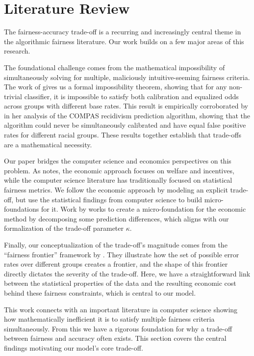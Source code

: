 \section{Literature Review}

The fairness-accuracy trade-off is a recurring and increasingly central theme in the algorithmic fairness literature. Our work builds on a few major areas of this research.

The foundational challenge comes from the mathematical impossibility of simultaneously solving for multiple, maliciously intuitive-seeming fairness criteria. The work of \citet{Kleinberg2017} gives us a formal impossibility theorem, showing that for any non-trivial classifier, it is impossible to satisfy both calibration and equalized odds across groups with different base rates. This result is empirically corroborated by \citet{Chouldechova2017} in her analysis of the COMPAS recidivism prediction algorithm, showing that the algorithm could never be simultaneously calibrated and have equal false positive rates for different racial groups. These results together establish that trade-offs are a mathematical necessity.

Our paper bridges the computer science and economics perspectives on this problem. As \citet{Gans2025} notes, the economic approach focuses on welfare and incentives, while the computer science literature has traditionally focused on statistical fairness metrics. We follow the economic approach by modeling an explicit trade-off, but use the statistical findings from computer science to build micro-foundations for it. Work by \citet{Rambachan2020} works to create a micro-foundation for the economic method by decomposing some prediction differences, which aligns with our formalization of the trade-off parameter $\kappa$.

Finally, our conceptualization of the trade-off's magnitude comes from the ``fairness frontier'' framework by \citet{Liang2025}. They illustrate how the set of possible error rates over different groups creates a frontier, and the shape of this frontier directly dictates the severity of the trade-off. Here, we have a straightforward link between the statistical properties of the data and the resulting economic cost behind these fairness constraints, which is central to our model.

This work connects with an important literature in computer science showing how mathematically inefficient it is to satisfy multiple fairness criteria simultaneously. From this we have a rigorous foundation for why a trade-off between fairness and accuracy often exists. This section covers the central findings motivating our model's core trade-off.

